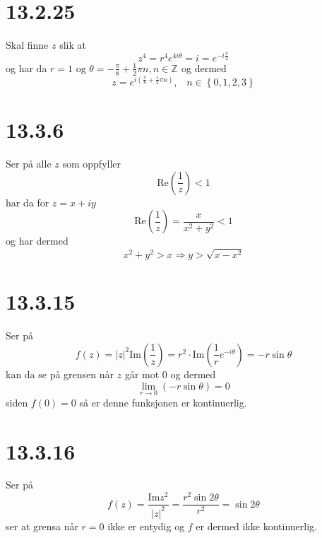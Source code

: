 \documentclass{report}
\newcommand{\M}[2]{\mathbb{#1}^{#2}}
\newcommand{\nbrack}[1]{\left( #1 \right)}
\newcommand{\cbrack}[1]{\left\lbrace #1 \right\rbrace}
\newcommand{\im}{\text{Im}}
\newcommand{\re}{\text{Re}}
\begin{document}
\section*{13.2.25}
Skal finne $z$ slik at
\begin{equation}
  \label{eq:14}
  z^{4} = r^{4}e^{4i\theta} = i = e^{-i\frac{\pi}{2}}
\end{equation}
og har da $r=1$ og $\theta = -\frac{\pi}{8} + \frac{1}{2} \pi n, n \in \M{Z}{}$ og dermed
\begin{equation}
  \label{eq:15}
  z = e^{i\nbrack{\frac{\pi}{8} + \frac{1}{2}\pi n}}, \;\;\; n \in \cbrack{0, 1, 2, 3}
\end{equation}


\section*{13.3.6}
Ser på alle $z$ som oppfyller
\begin{equation}
  \label{eq:16}
  \re \nbrack{\frac{1}{z}} < 1
\end{equation}
har da for $z = x + iy$
\begin{equation}
  \label{eq:17}
  \re \nbrack{\frac{1}{z}} = \frac{x}{x^{2} + y^{2}} < 1
\end{equation}
og har dermed
\begin{equation}
  \label{eq:18}
  x^{2} + y^{2} > x \Rightarrow y > \sqrt{ x - x^{2} }
\end{equation}


\section*{13.3.15}
Ser på
\begin{equation}
  \label{eq:19}
  f(z) = |z|^{2} \im \nbrack{\frac{1}{z}} = r^{2} \cdot \im \nbrack{ \frac{1}{r} e^{-i\theta} } = -r\sin \theta
\end{equation}
kan da se på grensen når $z$ går mot 0 og dermed
\begin{equation}
  \label{eq:20}
  \lim_{r \rightarrow 0} \nbrack{ -r \sin \theta } = 0
\end{equation}
siden $f(0) = 0$ så er denne funksjonen er kontinuerlig.



\section*{13.3.16}
Ser på
\begin{equation}
  \label{eq:22}
  f(z) = \frac{\im z^{2}}{|z|^{2}} = \frac{r^{2}\sin 2\theta}{r^{2}} = \sin 2\theta
\end{equation}
ser at grensa når $r=0$ ikke er entydig og $f$ er dermed ikke kontinuerlig.
\end{document}
